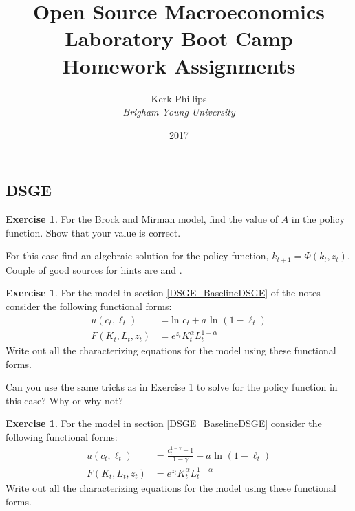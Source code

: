 \documentclass[letterpaper,12pt]{article}
\theoremstyle{definition}
\newtheorem{exercise}[theorem]{Exercise}
\begin{document}
\begin{titlepage}
	\title{Open Source Macroeconomics Laboratory Boot Camp \\ Homework Assignments}  %
	\author{Kerk Phillips\\ \emph{Brigham Young University}}
	\date{\LARGE{2017}}
	\maketitle
\end{titlepage}

\begin{spacing}{1.5}


\section*{DSGE}\label{DSGE_HW}

	\begin{exercise} \label{DSGE_HW_BM_FindA}
		For the Brock and Mirman model, find the value of $A$ in the policy function.  Show that your value is correct.

		For this case find an algebraic solution for the policy function, $k_{t+1} = \Phi (k_t,z_t)$.  Couple of good sources for hints are \citet[exercise 2.2, p. 12]{StokeyLucas1989} and \citet[exercise 1.1, p. 47]{Sargent1987}.
	\end{exercise}

	\begin{exercise} \label{DSGE_HW_CharEq_Ln}
		For the model in section \ref{DSGE_BaselineDSGE} of the notes consider the following functional forms:
		\begin{equation}\label{DSGE_HW_CharEq_Ln_eq01}
		\begin{split}
		u(c_t,\ell_t) & = \text{ln }c_t + a \text{ ln }(1-\ell_t)\\
		F(K_t,L_t,z_t) & = e^{z_t}K^{\alpha}_t L^{1-\alpha}_t  \nonumber
		\end{split}
		\end{equation}
		Write out all the characterizing equations for the model using these functional forms.

		Can you use the same tricks as in Exercise 1 to solve for the policy function in this case?  Why or why not?
	\end{exercise}

	\begin{exercise} \label{DSGE_HW_CharEq_CES_Ln}
		For the model in section \ref{DSGE_BaselineDSGE} consider the following functional forms:
		\begin{equation}\label{DSGE_HW_CharEq_CES_Ln_eq01}
		\begin{split}
		u(c_t,\ell_t) & = \frac{c^{1-\gamma}_t -1}{1-\gamma}+ a \text{ ln }(1-\ell_t)\\
		F(K_t,L_t,z_t) & = e^{z_t}K^{\alpha}_t L^{1-\alpha}_t  \nonumber
		\end{split}
		\end{equation}
		Write out all the characterizing equations for the model using these functional forms.
	\end{exercise}


\end{spacing}
\end{document}
